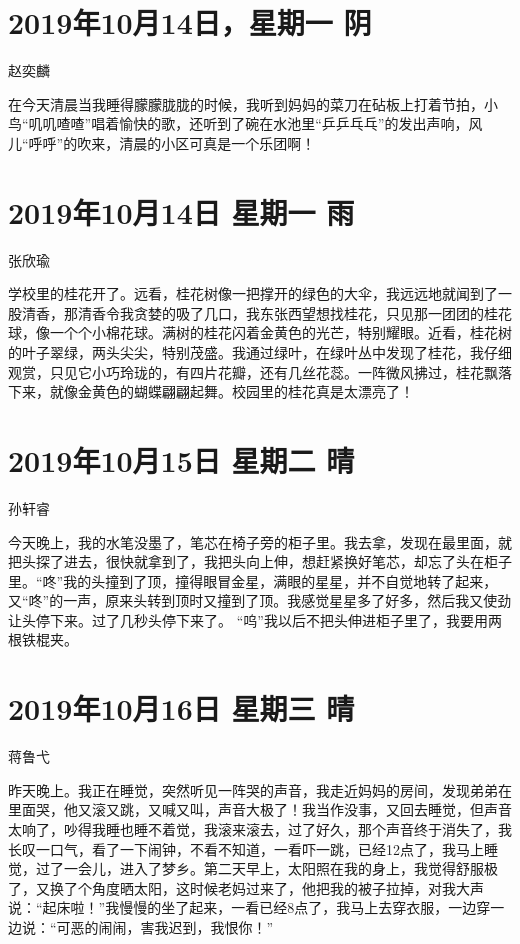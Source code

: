 \section{2019年10月14日，星期一 阴}

赵奕麟

在今天清晨当我睡得朦朦胧胧的时候，我听到妈妈的菜刀在砧板上打着节拍，小鸟“叽叽喳喳”唱着愉快的歌，还听到了碗在水池里“乒乒乓乓”的发出声响，风儿“呼呼”的吹来，清晨的小区可真是一个乐团啊！

\section{2019年10月14日 星期一 雨}

张欣瑜

学校里的桂花开了。远看，桂花树像一把撑开的绿色的大伞，我远远地就闻到了一股清香，那清香令我贪婪的吸了几口，我东张西望想找桂花，只见那一团团的桂花球，像一个个小棉花球。满树的桂花闪着金黄色的光芒，特别耀眼。近看，桂花树的叶子翠绿，两头尖尖，特别茂盛。我通过绿叶，在绿叶丛中发现了桂花，我仔细观赏，只见它小巧玲珑的，有四片花瓣，还有几丝花蕊。一阵微风拂过，桂花飘落下来，就像金黄色的蝴蝶翩翩起舞。校园里的桂花真是太漂亮了！

\section{2019年10月15日 星期二 晴}

孙轩睿

今天晚上，我的水笔没墨了，笔芯在椅子旁的柜子里。我去拿，发现在最里面，就把头探了进去，很快就拿到了，我把头向上伸，想赶紧换好笔芯，却忘了头在柜子里。“咚”我的头撞到了顶，撞得眼冒金星，满眼的星星，并不自觉地转了起来，又“咚”的一声，原来头转到顶时又撞到了顶。我感觉星星多了好多，然后我又使劲让头停下来。过了几秒头停下来了。
“呜”我以后不把头伸进柜子里了，我要用两根铁棍夹。

\section{2019年10月16日 星期三 晴}

蒋鲁弋

昨天晚上。我正在睡觉，突然听见一阵哭的声音，我走近妈妈的房间，发现弟弟在里面哭，他又滚又跳，又喊又叫，声音大极了！我当作没事，又回去睡觉，但声音太响了，吵得我睡也睡不着觉，我滚来滚去，过了好久，那个声音终于消失了，我长叹一口气，看了一下闹钟，不看不知道，一看吓一跳，已经12点了，我马上睡觉，过了一会儿，进入了梦乡。第二天早上，太阳照在我的身上，我觉得舒服极了，又换了个角度晒太阳，这时候老妈过来了，他把我的被子拉掉，对我大声说：“起床啦！”我慢慢的坐了起来，一看已经8点了，我马上去穿衣服，一边穿一边说：“可恶的闹闹，害我迟到，我恨你！”

